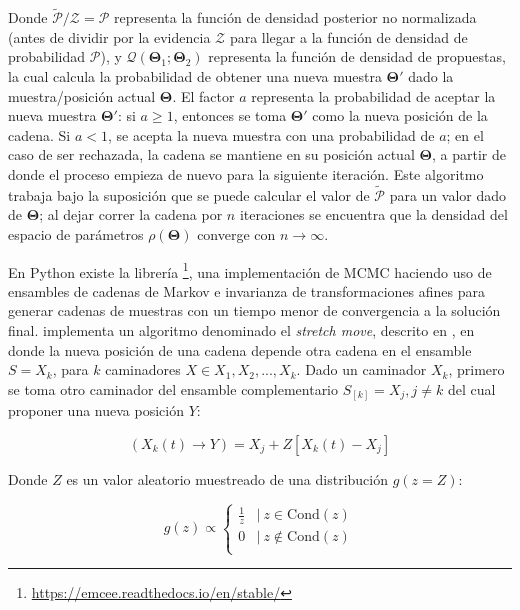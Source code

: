 Donde $\tilde{\mathcal{P}}/\mathcal{Z} = \mathcal{P}$ representa la función de
densidad posterior no normalizada (antes de dividir por la evidencia
$\mathcal{Z}$ para llegar a la función de densidad de probabilidad
$\mathcal{P}$), y $\mathcal{Q}(\mathbf{\Theta}_1 ; \mathbf{\Theta}_2)$
representa la función de densidad de propuestas, la cual calcula la probabilidad
de obtener una nueva muestra $\mathbf{\Theta}'$ dado la muestra/posición actual
$\mathbf{\Theta}$. El factor $a$ representa la probabilidad de aceptar la nueva
muestra $\mathbf{\Theta}'$: si $a \geq 1$, entonces se toma $\mathbf{\Theta}'$
como la nueva posición de la cadena. Si $a <1$, se acepta la nueva muestra con
una probabilidad de $a$; en el caso de ser rechazada, la cadena se mantiene en
su posición actual $\mathbf{\Theta}$, a partir de donde el proceso empieza de
nuevo para la siguiente iteración. Este algoritmo trabaja bajo la suposición que
se puede calcular el valor de $\tilde{\mathcal{P}}$ para un valor dado de
$\mathbf{\Theta}$; al dejar correr la cadena por $n$ iteraciones se encuentra
que la densidad del espacio de parámetros $\rho(\mathbf{\Theta})$ converge con
$n \rightarrow \infty$.

En Python existe la librería
\footnote{\url{https://emcee.readthedocs.io/en/stable/}}, una
implementación de MCMC haciendo uso de ensambles de cadenas de Markov e
invarianza de transformaciones afines para generar cadenas de muestras con un
tiempo menor de convergencia a la solución final.  implementa un
algoritmo denominado el \textit{stretch move}, descrito en
,
en donde la nueva posición de una cadena depende otra cadena en el ensamble $S =
{X_k}$, para $k$ caminadores $X \in {X_1, X_2, ..., X_k}$. Dado un caminador
$X_k$, primero se toma otro caminador del ensamble complementario $S_{[k]} =
{X_j, j \neq k}$ del cual proponer una nueva posición $Y$:

\begin{eqfloat}[!ht]
	\centering
	\begin{equation}
		(X_{k}(t) \rightarrow Y) = X_j + Z[X_{k}(t) - X_j]
	\end{equation}
\end{eqfloat}

Donde $Z$ es un valor aleatorio muestreado de una distribución $g(z = Z)$:

\begin{eqfloat}[!ht]
	\centering
	\begin{equation}
		g(z) \propto \left\{\begin{matrix}
			\frac{1}{z} & | \ z \in \mathrm{Cond}(z) \\
			0 &| \ z \notin \mathrm{Cond}(z) \\
			\end{matrix}\right.
	\end{equation}
\end{eqfloat}

